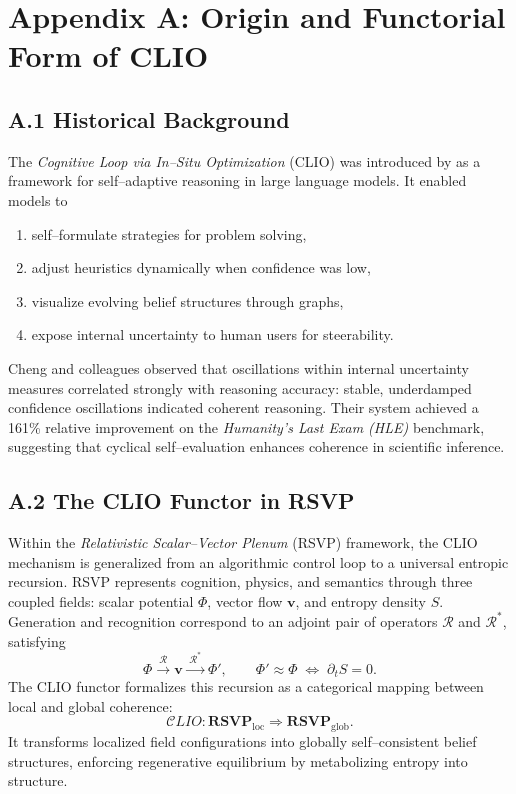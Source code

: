 \documentclass[11pt]{article}
\begin{document}
\newpage
\section*{Appendix A: Origin and Functorial Form of CLIO}

\subsection*{A.1 Historical Background}

The \textit{Cognitive Loop via In--Situ Optimization} (CLIO) was introduced by
\citet{cheng2025clio} as a framework for self--adaptive reasoning in large language
models. It enabled models to
\begin{enumerate}
    \item self--formulate strategies for problem solving,
    \item adjust heuristics dynamically when confidence was low,
    \item visualize evolving belief structures through graphs,
    \item expose internal uncertainty to human users for steerability.
\end{enumerate}
Cheng and colleagues observed that oscillations within internal uncertainty
measures correlated strongly with reasoning accuracy: stable, underdamped
confidence oscillations indicated coherent reasoning.
Their system achieved a 161\% relative improvement on the
\textit{Humanity’s Last Exam (HLE)} benchmark, suggesting that cyclical
self--evaluation enhances coherence in scientific inference.

\subsection*{A.2 The CLIO Functor in RSVP}

Within the \textit{Relativistic Scalar--Vector Plenum} (RSVP) framework, the CLIO
mechanism is generalized from an algorithmic control loop to a universal
entropic recursion.  
RSVP represents cognition, physics, and semantics through three coupled fields:
scalar potential $\Phi$, vector flow $\mathbf{v}$, and entropy density $S$.  
Generation and recognition correspond to an adjoint pair of operators
$\mathcal{R}$ and $\mathcal{R}^\ast$, satisfying
\[
\Phi \xrightarrow{\;\mathcal{R}\;} \mathbf{v}
\xrightarrow{\;\mathcal{R}^\ast\;} \Phi',
\qquad
\Phi' \approx \Phi \;\Leftrightarrow\; \partial_t S = 0.
\]
The CLIO functor formalizes this recursion as a categorical mapping between
local and global coherence:
\[
\mathcal{C}\!L\!I\!O : \mathbf{RSVP}_{\mathrm{loc}} \Rightarrow \mathbf{RSVP}_{\mathrm{glob}}.
\]
It transforms localized field configurations into globally self--consistent
belief structures, enforcing regenerative equilibrium by metabolizing entropy
into structure.
\end{document}
